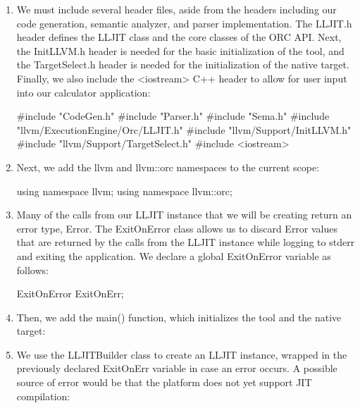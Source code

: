 \begin{enumerate}
\item
We must include several header files, aside from the headers including our code generation, semantic analyzer, and parser implementation. The LLJIT.h header defines the LLJIT class and the core classes of the ORC API. Next, the InitLLVM.h header is needed for the basic initialization of the tool, and the TargetSelect.h header is needed for the initialization of the native target. Finally, we also include the <iostream> C++ header to allow for user input into our calculator application:

\begin{cpp}
#include "CodeGen.h"
#include "Parser.h"
#include "Sema.h"
#include "llvm/ExecutionEngine/Orc/LLJIT.h"
#include "llvm/Support/InitLLVM.h"
#include "llvm/Support/TargetSelect.h"
#include <iostream>
\end{cpp}

\item
Next, we add the llvm and llvm::orc namespaces to the current scope:

\begin{cpp}
using namespace llvm;
using namespace llvm::orc;
\end{cpp}

\item
Many of the calls from our LLJIT instance that we will be creating return an error type, Error. The ExitOnError class allows us to discard Error values that are returned by the calls from the LLJIT instance while logging to stderr and exiting the application. We declare a global ExitOnError variable as follows:

\begin{cpp}
ExitOnError ExitOnErr;
\end{cpp}

\item
Then, we add the main() function, which initializes the tool and the native target:

\begin{cpp}
int main(int argc, const char **argv{
    InitLLVM X(argc, argv);
    InitializeNativeTarget();
    InitializeNativeTargetAsmPrinter();
    InitializeNativeTargetAsmParser();
\end{cpp}

\item
We use the LLJITBuilder class to create an LLJIT instance, wrapped in the previously declared ExitOnErr variable in case an error occurs. A possible source of error would be that the platform does not yet support JIT compilation:


\end{enumerate}
